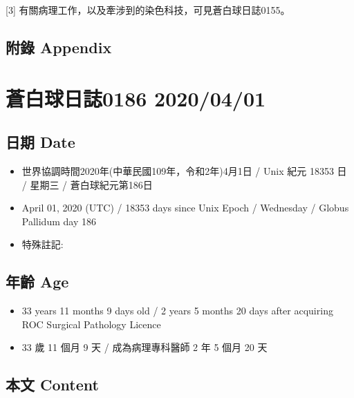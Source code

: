 \documentclass[a5paper, 12pt
]{book}
\providecommand{\tightlist}{%
  \setlength{\itemsep}{0pt}\setlength{\parskip}{0pt}}
\begin{document}
{[}3{]} 有關病理工作，以及牽涉到的染色科技，可見蒼白球日誌0155。

\hypertarget{ux9644ux9304-appendix-30}{%
\subsection{附錄 Appendix}\label{ux9644ux9304-appendix-30}}

\hypertarget{ux84bcux767dux7403ux65e5ux8a8c0186-20200401}{%
\section{蒼白球日誌0186
2020/04/01}\label{ux84bcux767dux7403ux65e5ux8a8c0186-20200401}}

\hypertarget{ux65e5ux671f-date-31}{%
\subsection{日期 Date}\label{ux65e5ux671f-date-31}}

\begin{itemize}
\tightlist
\item
  世界協調時間2020年(中華民國109年，令和2年)4月1日 / Unix 紀元 18353 日
  / 星期三 / 蒼白球紀元第186日
\item
  April 01, 2020 (UTC) / 18353 days since Unix Epoch / Wednesday /
  Globus Pallidum day 186
\item
  特殊註記:
\end{itemize}

\hypertarget{ux5e74ux9f61-age-31}{%
\subsection{年齡 Age}\label{ux5e74ux9f61-age-31}}

\begin{itemize}
\tightlist
\item
  33 years 11 months 9 days old / 2 years 5 months 20 days after
  acquiring ROC Surgical Pathology Licence
\item
  33 歲 11 個月 9 天 / 成為病理專科醫師 2 年 5 個月 20 天
\end{itemize}

\hypertarget{ux672cux6587-content-31}{%
\subsection{本文 Content}\label{ux672cux6587-content-31}}
\end{document}
